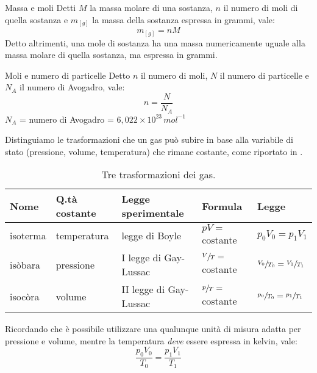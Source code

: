 \documentclass[a4paper,11pt,italian]{article}
\begin{document}
\begin{description}
\begin{soloscientifico} %
  \item[Massa e moli]
  Detti $ M $ la massa molare di una sostanza, $ n $  il numero di moli di quella sostanza e $ m_{[g]} $ la massa della sostanza espressa in grammi, vale: 
  \[ m_{[g]} = n M \]
  Detto altrimenti, una mole di sostanza ha una massa numericamente uguale alla massa molare di quella sostanza, ma espressa in grammi.

  \item[Moli e numero di particelle]
  Detto $ n $ il numero di moli, $ N $ il numero di particelle e $ N_A $ il numero di Avogadro, vale: 
  \[ n = \frac{N}{N_A} \]
  $ N_A $ = numero di Avogadro = $ 6,022 \times 10^{23} \, mol^{-1} $
\end{soloscientifico}   %
  
  \item[Trasformazioni dei gas]
  Distinguiamo le trasformazioni che un gas può subire in base alla variabile di stato (pressione, volume, temperatura) che rimane costante, come riportato in .
  
  \begin{table}[htb]\centering
  \begin{tabular}{lllll}\toprule
     \textbf{Nome}  & \textbf{Q.tà costante}  & \textbf{Legge sperimentale} & \textbf{Formula}            & \textbf{Legge}\\\midrule
     isoterma       & temperatura             & legge di Boyle              & $ pV= $ costante            & $ p_0V_0 = p_1V_1  $\\\addlinespace[.2em]
     isòbara        & pressione               & I legge di Gay-Lussac       & $ \sfrac{V}{T} = $ costante & $ \sfrac{V_0}{T_0} = \sfrac{V_1}{T_1} $\\\addlinespace[.2em]
     isocòra        & volume                  & II legge di Gay-Lussac      & $ \sfrac{p}{T} = $ costante & $ \sfrac{p_0}{T_0} = \sfrac{p_1}{T_1} $\\\bottomrule
   \end{tabular}
   \caption{Tre trasformazioni dei gas.}
  \label{tab:trasformazioni}
   \end{table}
  
  \item[Formula dei gas perfetti]
  Ricordando che è possibile utilizzare una qualunque unità di misura adatta per pressione e volume, mentre la temperatura \emph{deve} essere espressa in kelvin, vale: 
  \[ \dfrac{p_0 V_0}{T_0} = \dfrac{p_1 V_1}{T_1} \]
  

\end{description}
\end{document}
